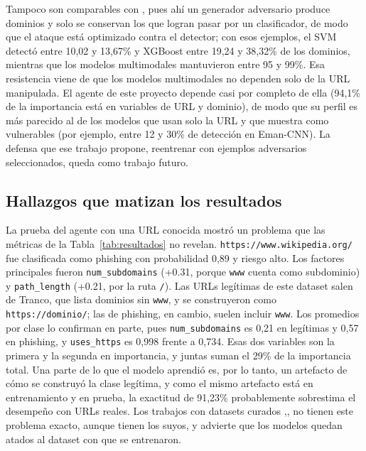 Tampoco son comparables con \cite{duy2024study}, pues ahí un generador adversario produce dominios y solo se conservan los que logran pasar por un clasificador, de modo que el ataque está optimizado contra el detector; con esos ejemplos, el SVM detectó entre 10,02 y 13,67\% y XGBoost entre 19,24 y 38,32\% de los dominios, mientras que los modelos multimodales mantuvieron entre 95 y 99\%. Esa resistencia viene de que los modelos multimodales no dependen solo de la URL manipulada. El agente de este proyecto depende casi por completo de ella (94,1\% de la importancia está en variables de URL y dominio), de modo que su perfil es más parecido al de los modelos que usan solo la URL y que \cite{duy2024study} muestra como vulnerables (por ejemplo, entre 12 y 30\% de detección en Eman-CNN). La defensa que ese trabajo propone, reentrenar con ejemplos adversarios seleccionados, queda como trabajo futuro.

\subsection{Hallazgos que matizan los resultados}

La prueba del agente con una URL conocida mostró un problema que las métricas de la Tabla~\ref{tab:resultados} no revelan. \texttt{https://www.wikipedia.org/} fue clasificada como phishing con probabilidad 0,89 y riesgo alto. Los factores principales fueron \texttt{num\_subdomains} (+0.31, porque \texttt{www} cuenta como subdominio) y \texttt{path\_length} (+0.21, por la ruta \texttt{/}). Las URLs legítimas de este dataset salen de Tranco, que lista dominios sin \texttt{www}, y se construyeron como \texttt{https://dominio/}; las de phishing, en cambio, suelen incluir \texttt{www}. Los promedios por clase lo confirman en parte, pues \texttt{num\_subdomains} es 0,21 en legítimas y 0,57 en phishing, y \texttt{uses\_https} es 0,998 frente a 0,734. Esas dos variables son la primera y la segunda en importancia, y juntas suman el 29\% de la importancia total. Una parte de lo que el modelo aprendió es, por lo tanto, un artefacto de cómo se construyó la clase legítima, y como el mismo artefacto está en entrenamiento y en prueba, la exactitud de 91,23\% probablemente sobrestima el desempeño con URLs reales. Los trabajos con datasets curados \cite{kalabarige2022multilayer},\cite{kalabarige2023boosting},\cite{alsariera2020ai} no tienen este problema exacto, aunque tienen los suyos, y \cite{ahmad2025across} advierte que los modelos quedan atados al dataset con que se entrenaron. \newline

